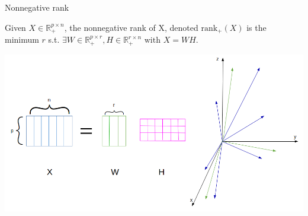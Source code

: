\begin{frame}{Nonnegative rank}
\begin{defn}
Given $X \in \mathbb{R}_+^{p\times n}$, the nonnegative rank of X, denoted $\text{rank}_+(X)$ is the minimum $r$ s.t. $\exists W \in \mathbb{R}_+^{p\times r}, H \in \mathbb{R}_+^{r\times n} \text{ with } X = WH$.
\end{defn}
\centering
\includegraphics[scale=0.28]{../images/NMFvect.png}
\end{frame}

